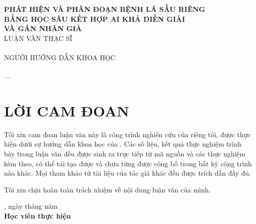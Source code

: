 \documentclass[12pt, a4paper, oneside]{report}
\begin{document}
{\LARGE\bfseries
PHÁT HIỆN VÀ PHÂN ĐOẠN BỆNH LÁ SẦU RIÊNG\\[0.35cm]
BẰNG HỌC SÂU KẾT HỢP AI KHẢ DIỄN GIẢI\\[0.35cm]
VÀ GÁN NHÃN GIẢ
}\\[1.5cm]

{\large LUẬN VĂN THẠC SĨ}\\[0.3cm]
{\large {}}\\[2.5cm]

{\large NGƯỜI HƯỚNG DẪN KHOA HỌC}\\[0.4cm]
{\large\bfseries {}}\\[3cm]

\vfill
{\large {} --- \the\year}
\par
\endgroup
\clearpage

\chapter*{LỜI CAM ĐOAN}

Tôi xin cam đoan luận văn này là công trình nghiên cứu của riêng tôi, được thực
hiện dưới sự hướng dẫn khoa học của . Các số liệu, kết
quả thực nghiệm trình bày trong luận văn đều được sinh ra trực tiếp từ mã nguồn và
các  thực nghiệm kèm theo, có thể tái tạo được và chưa từng được
công bố trong bất kỳ công trình nào khác. Mọi tham khảo từ tài liệu của tác giả
khác đều được trích dẫn đầy đủ.

Tôi xin chịu hoàn toàn trách nhiệm về nội dung luận văn của mình.

\vspace{1.5cm}
\begin{flushright}
\begin{minipage}{7cm}
\centering
{}, ngày \quad tháng \quad năm \the\year\\[0.3cm]
\textbf{Học viên thực hiện}\\[2.5cm]
\end{minipage}
\end{flushright}

\end{document}
